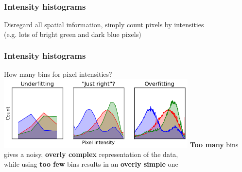 
\begin{frame}
  \frametitle{Intensity histograms}

  \begin{center}
    Disregard all spatial information, simply count pixels by intensities \\
    (e.g. lots of bright green and dark blue pixels)
    \vskip20pt
  \end{center}

\end{frame}


\begin{frame}
  \frametitle{Intensity histograms}

  \begin{center}
    How many bins for pixel intensities?
    \vskip20pt
    \includegraphics[width=0.75\textwidth]{chairs_hists.png}
    \vskip20pt
    \textbf{Too many} bins gives a noisy, \textbf{overly complex} representation of the data,\\
    while using \textbf{too few} bins results in an \textbf{overly simple} one
  \end{center}

\end{frame}


